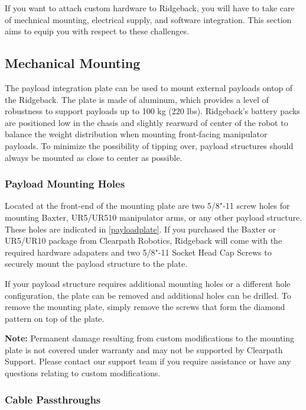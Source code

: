 \documentclass[]{clearpath-latex/clearpath-manual}
\begin{document}
If you want to attach custom hardware to Ridgeback, you will have to take care of mechnical mounting, electrical supply, and software integration.  This section aims to equip you with respect to these challenges.

\subsection{Mechanical Mounting}
\label{mechanical}

The payload integration plate can be used to mount external payloads ontop of the Ridgeback.   The plate is made of aluminum, which provides a level of robustness to support payloads up to 100 kg (220 lbs).   Ridgeback's battery packs are positioned low in the chasis and slightly rearward of center of the robot to balance the weight distribution when mounting front-facing manipulator payloads. To minimize the possibility of tipping over, payload structures should always be mounted as close to center as possible.

\subsubsection{Payload Mounting Holes}

Located at the front-end of the mounting plate are two 5/8"-11 screw holes for mounting Baxter, UR5/UR510 manipulator arms, or any other payload structure.  These holes are indicated in \autoref{payloadplate}. If you purchased the Baxter or UR5/UR10 package from Clearpath Robotics, Ridgeback will come with the required hardware adapaters and two 5/8"-11 Socket Head Cap Screws to securely mount the payload structure to the plate.

If your payload structure requires additional mounting holes or a different hole configuration, the plate can be removed and additional holes can be drilled.  To remove the mounting plate, simply remove the screws that form the diamond pattern on top of the plate.

\textbf{Note:}  Permanent damage resulting from custom modifications to the mounting plate is not covered under warranty and may not be supported by Clearpath Support.  Please contact our support team if you require assistance or have any questions relating to custom modifications.


\subsubsection{Cable Passthroughs}
\end{document}
